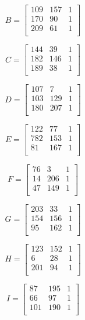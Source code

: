 \documentclass[12pft, english]{article}
\begin{document}
\begin{multicols}{2}
  \[
    B =
    \begin{bmatrix}
      109 & 157 & 1 \\
      170 & 90  & 1 \\
      209 & 61  & 1\\
    \end{bmatrix}
  \]


  \[
    C =
    \begin{bmatrix}
      144 & 39  & 1 \\
      182 & 146 & 1 \\
      189 & 38  & 1\\
    \end{bmatrix}
  \]

  \[
    D =
    \begin{bmatrix}
      107 & 7   & 1 \\
      103 & 129 & 1 \\
      180 & 207 & 1\\
    \end{bmatrix}
  \]

  \[
    E =
    \begin{bmatrix}
      122 & 77  & 1 \\
      782 & 153 & 1 \\
      81  & 167 & 1\\
    \end{bmatrix}
  \]

  \[
    F =
    \begin{bmatrix}
      76  & 3   & 1 \\
      14  & 206 & 1 \\
      47  & 149 & 1\\
    \end{bmatrix}
  \]

  \[
    G =
    \begin{bmatrix}
      203 & 33  & 1 \\
      154 & 156 & 1 \\
      95  & 162 & 1\\
    \end{bmatrix}
  \]

  \[
    H =
    \begin{bmatrix}
      123 & 152 & 1 \\
      6   & 28  & 1 \\
      201 & 94  & 1\\
    \end{bmatrix}
  \]

  \[
    I =
    \begin{bmatrix}
      87  & 195 & 1 \\
      66  & 97  & 1 \\
      101 & 190 & 1\\
    \end{bmatrix}
  \]


\end{multicols}
\end{document}
